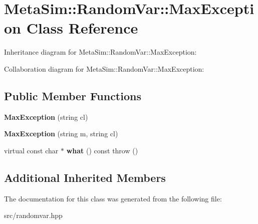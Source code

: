 \hypertarget{classMetaSim_1_1RandomVar_1_1MaxException}{}\section{Meta\+Sim\+:\+:Random\+Var\+:\+:Max\+Exception Class Reference}
\label{classMetaSim_1_1RandomVar_1_1MaxException}


Inheritance diagram for Meta\+Sim\+:\+:Random\+Var\+:\+:Max\+Exception\+:


Collaboration diagram for Meta\+Sim\+:\+:Random\+Var\+:\+:Max\+Exception\+:
\subsection*{Public Member Functions}
\begin{DoxyCompactItemize}
\item 
{\bfseries Max\+Exception} (string cl)
\item 
{\bfseries Max\+Exception} (string m, string cl)
\item 
virtual const char $\ast$ {\bfseries what} () const   throw ()
\end{DoxyCompactItemize}
\subsection*{Additional Inherited Members}


The documentation for this class was generated from the following file\+:\begin{DoxyCompactItemize}
\item 
src/randomvar.\+hpp\end{DoxyCompactItemize}
